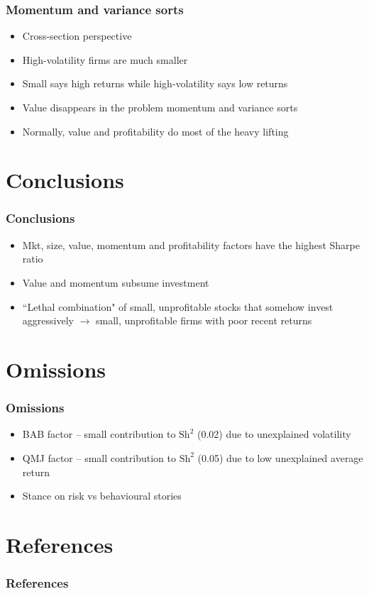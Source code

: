 \documentclass{beamer}
\begin{document}
\begin{frame}
\frametitle{Momentum and variance sorts}
\begin{itemize}
    \item Cross-section perspective
    \item High-volatility firms are much smaller
    \item Small says high returns while high-volatility says low returns
    \item Value disappears in the problem momentum and variance sorts
    \item Normally, value and profitability do most of the heavy lifting
\end{itemize}
\end{frame}

\section{Conclusions}

\begin{frame}
\frametitle{Conclusions}
\begin{itemize}
    \item Mkt, size, value, momentum and profitability factors have the
    highest Sharpe ratio
    \item Value and momentum subsume investment
    \item ``Lethal combination" of small, unprofitable stocks that somehow
    invest aggressively $\rightarrow$ small, unprofitable firms with poor
    recent returns
\end{itemize}
\end{frame}

\section{Omissions}

\begin{frame}
\frametitle{Omissions}
\begin{itemize}
    \item BAB factor -- small contribution to $\text{Sh}^2$ (0.02) due to
    unexplained volatility
    \item QMJ factor -- small contribution to $\text{Sh}^2$ (0.05) due to low
    unexplained average return
    \item Stance on risk vs behavioural stories
\end{itemize}
\end{frame}

\section{References}

\begin{frame}[allowframebreaks]
  \frametitle{References}
  \printbibliography
\end{frame}
\end{document}
